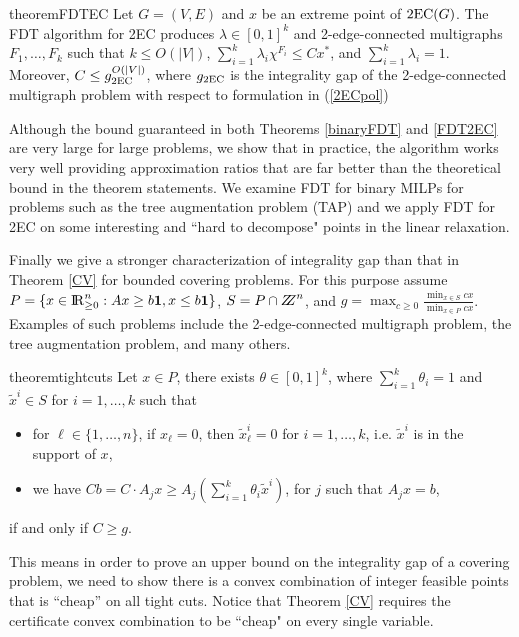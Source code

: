\documentclass[runningheads]{llncs}
\begin{document}
\begin{restatable}{theorem}{FDTEC}
	\label{FDT2EC}
	Let $G=(V,E)$ and $x$ be an extreme point of  $\operatorname{2EC}(G)$. The FDT algorithm for 2EC produces $\lambda\in [0,1]^k$ and 2-edge-connected multigraphs $F_1,\ldots,F_k$ such that $k\leq O(|V|)$, $\sum_{i=1}^{k}\lambda_i \chi^{F_i}\leq Cx^*$, and $\sum_{i=1}^{k}\lambda_i = 1$. Moreover, $C\leq g_{\operatorname{2EC}}^{O(|V|)}$, where $g_{\operatorname{2EC}}$ is the integrality gap of the 2-edge-connected multigraph problem with respect to formulation in (\ref{2ECpol}) 
\end{restatable}

Although the bound guaranteed in both Theorems \ref{binaryFDT} and \ref{FDT2EC} are very large for large problems, we show that in practice, the algorithm works very well providing approximation ratios that are far better than the theoretical bound in the theorem statements. We examine FDT for binary MILPs for problems such as the tree augmentation problem (TAP) and we apply FDT for 2EC on some interesting and ``hard to decompose" points in the linear relaxation. 

Finally we give a stronger characterization of integrality gap than that in Theorem \ref{CV} for bounded covering problems. For this purpose assume $P= \{x\in {\rm I\!R}^n_{\geq 0}: Ax\geq b\textbf{1}, x \leq b\textbf{1}\}$, $S= P\cap \bbbz^n$, and $g= \max_{c\geq 0} \frac{\min_{x\in S}cx}{\min_{x\in P}cx}$. Examples of such problems include the 2-edge-connected multigraph problem, the tree augmentation problem, and many others.


\begin{restatable}{theorem}{tightcuts}
	\label{tightcuts}
	Let $x\in P$, there exists $\theta\in [0,1]^k$, where $\sum_{i=1}^{k}\theta_i = 1$ and $\tilde{x}^i \in S$ for $i=1,\ldots,k$ such that \begin{itemize}
		\item for $\ell\in \{1,\ldots,n\}$, if $x_\ell =0$, then $\tilde{x}^i_\ell=0$ for $i =1,\ldots,k$, i.e. $\tilde{x}^i$ is in the support of $x$,
		\item we have $Cb = C\cdot A_j x \geq A_j (\sum_{i=1}^{k}\theta_i\tilde{x}^i)$, for $j$ such that $A_j x =b$,  
	\end{itemize}
	if and only if $C\geq g$.
\end{restatable}



This means in order to prove an upper bound on the integrality gap of a covering problem, we need to show there is a convex combination of integer feasible points that is ``cheap'' on all tight cuts. Notice that Theorem \ref{CV} requires the certificate convex combination to be ``cheap" on every single variable.
\end{document}
